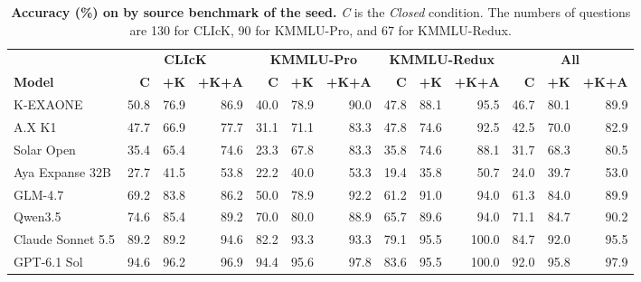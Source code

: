 \begin{table}[t]
\centering
\small
\caption{\textbf{Accuracy (\%) on \name{} by source benchmark of the seed.}
\textit{C} is the \textit{Closed} condition. The numbers of questions are 130 for CLIcK, 90 for KMMLU-Pro, and 67 for KMMLU-Redux.}
\label{tab:by_benchmark}
\begin{tabular*}{\textwidth}{@{\extracolsep{\fill}}lrrrrrrrrrrrr@{}}
\toprule
 & \multicolumn{3}{c}{\textbf{CLIcK}} & \multicolumn{3}{c}{\textbf{KMMLU-Pro}} & \multicolumn{3}{c}{\textbf{KMMLU-Redux}} & \multicolumn{3}{c}{\textbf{All}} \\
\cmidrule{2-4} \cmidrule{5-7} \cmidrule{8-10} \cmidrule{11-13}
\textbf{Model} & \textbf{C} & \textbf{+K} & \textbf{+K+A} & \textbf{C} & \textbf{+K} & \textbf{+K+A} & \textbf{C} & \textbf{+K} & \textbf{+K+A} & \textbf{C} & \textbf{+K} & \textbf{+K+A} \\
\midrule
K-EXAONE          & 50.8 & 76.9 & 86.9 & 40.0 & 78.9 & 90.0 & 47.8 & 88.1 & 95.5  & 46.7 & 80.1 & 89.9 \\
A.X K1            & 47.7 & 66.9 & 77.7 & 31.1 & 71.1 & 83.3 & 47.8 & 74.6 & 92.5  & 42.5 & 70.0 & 82.9 \\
Solar Open        & 35.4 & 65.4 & 74.6 & 23.3 & 67.8 & 83.3 & 35.8 & 74.6 & 88.1  & 31.7 & 68.3 & 80.5 \\
\midrule
Aya Expanse 32B   & 27.7 & 41.5 & 53.8 & 22.2 & 40.0 & 53.3 & 19.4 & 35.8 & 50.7  & 24.0 & 39.7 & 53.0 \\
\midrule
GLM-4.7           & 69.2 & 83.8 & 86.2 & 50.0 & 78.9 & 92.2 & 61.2 & 91.0 & 94.0  & 61.3 & 84.0 & 89.9 \\
Qwen3.5           & 74.6 & 85.4 & 89.2 & 70.0 & 80.0 & 88.9 & 65.7 & 89.6 & 94.0  & 71.1 & 84.7 & 90.2 \\
\midrule
Claude Sonnet 5.5 & 89.2 & 89.2 & 94.6 & 82.2 & 93.3 & 93.3 & 79.1 & 95.5 & 100.0 & 84.7 & 92.0 & 95.5 \\
GPT-6.1 Sol       & 94.6 & 96.2 & 96.9 & 94.4 & 95.6 & 97.8 & 83.6 & 95.5 & 100.0 & 92.0 & 95.8 & 97.9 \\
\bottomrule
\end{tabular*}
\end{table}